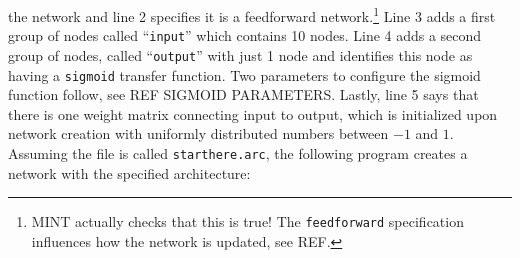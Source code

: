 \documentclass[12pt,letterpaper]{memoir}
\newcommand{\mint}{MINT\xspace}
\begin{document}
the network and line 2 specifies it is a feedforward
network.\footnote{\mint actually checks that this is true! The
  \lstinline{feedforward} specification influences how the network is
  updated, see REF.} Line 3 adds a first group of nodes called
``\lstinline{input}'' which contains 10 nodes. Line 4 adds a second
group of nodes, called ``\lstinline{output}'' with just 1 node and
identifies this node as having a \lstinline{sigmoid} transfer
function. Two parameters to configure the sigmoid function follow, see
REF SIGMOID PARAMETERS. Lastly, line 5 says that there is one weight
matrix connecting input to output, which is initialized upon network
creation with uniformly distributed numbers between $-1$ and $1$.
Assuming the file is called \lstinline{starthere.arc}, the following
program creates a network with the specified architecture:

 
\end{document}

